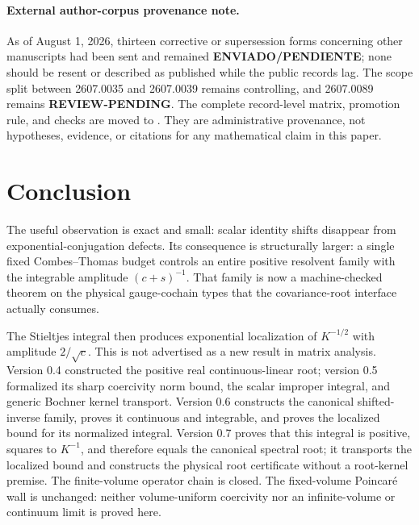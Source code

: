 \documentclass[11pt]{article}
\theoremstyle{definition}
\begin{document}
\paragraph{External author-corpus provenance note.}
As of August 1, 2026, thirteen corrective or supersession forms concerning
other manuscripts had been sent and remained \textbf{ENVIADO/PENDIENTE}; none
should be resent or described as published while the public records lag.
The scope split between 2607.0035 and 2607.0039 remains controlling, and
2607.0089 remains \textbf{REVIEW-PENDING}.  The complete record-level matrix,
promotion rule, and checks are moved to
.  They are
administrative provenance, not hypotheses, evidence, or citations for any
mathematical claim in this paper.

\section{Conclusion}\label{sec:conclusion}

The useful observation is exact and small:
scalar identity shifts disappear from exponential-conjugation defects.  Its
consequence is structurally larger: a single fixed Combes--Thomas budget
controls an entire positive resolvent family with the integrable amplitude
$(c+s)^{-1}$.  That family is now a machine-checked theorem on the physical
gauge-cochain types that the covariance-root interface actually consumes.

The Stieltjes integral then produces exponential localization of $K^{-1/2}$
with amplitude $2/\sqrt c$.  This is not advertised as a new result in matrix
analysis.  Version 0.4 constructed the positive real continuous-linear root;
version 0.5 formalized its sharp coercivity norm bound, the scalar improper
integral, and generic Bochner kernel transport.  Version 0.6 constructs the
canonical shifted-inverse family, proves it continuous and integrable, and
proves the localized bound for its normalized integral.  Version 0.7 proves
that this integral is positive, squares to $K^{-1}$, and therefore equals the
canonical spectral root; it transports the localized bound and constructs the
physical root certificate without a root-kernel premise.  The finite-volume
operator chain is closed.  The fixed-volume Poincar\'e wall is unchanged:
neither volume-uniform coercivity nor an infinite-volume or continuum limit is
proved here.
\end{document}
